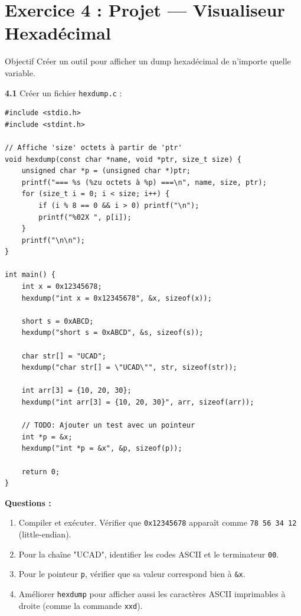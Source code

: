 \documentclass[10pt,a4paper]{article}
\begin{document}
\section{Exercice 4 : Projet — Visualiseur Hexadécimal}

\begin{exercicebox}{Objectif}
Créer un outil pour afficher un dump hexadécimal de n'importe quelle variable.
\end{exercicebox}

\textbf{4.1} Créer un fichier \texttt{hexdump.c} :

\begin{lstlisting}
#include <stdio.h>
#include <stdint.h>

// Affiche 'size' octets à partir de 'ptr'
void hexdump(const char *name, void *ptr, size_t size) {
    unsigned char *p = (unsigned char *)ptr;
    printf("=== %s (%zu octets à %p) ===\n", name, size, ptr);
    for (size_t i = 0; i < size; i++) {
        if (i % 8 == 0 && i > 0) printf("\n");
        printf("%02X ", p[i]);
    }
    printf("\n\n");
}

int main() {
    int x = 0x12345678;
    hexdump("int x = 0x12345678", &x, sizeof(x));
    
    short s = 0xABCD;
    hexdump("short s = 0xABCD", &s, sizeof(s));
    
    char str[] = "UCAD";
    hexdump("char str[] = \"UCAD\"", str, sizeof(str));
    
    int arr[3] = {10, 20, 30};
    hexdump("int arr[3] = {10, 20, 30}", arr, sizeof(arr));
    
    // TODO: Ajouter un test avec un pointeur
    int *p = &x;
    hexdump("int *p = &x", &p, sizeof(p));
    
    return 0;
}
\end{lstlisting}

\textbf{Questions :}
\begin{enumerate}[label=\alph*)]
    \item Compiler et exécuter. Vérifier que \texttt{0x12345678} apparaît comme \texttt{78 56 34 12} (little-endian).
    \item Pour la chaîne "UCAD", identifier les codes ASCII et le terminateur \texttt{00}.
    \item Pour le pointeur \texttt{p}, vérifier que sa valeur correspond bien à \texttt{\&x}.
    \item Améliorer \texttt{hexdump} pour afficher aussi les caractères ASCII imprimables à droite (comme la commande \texttt{xxd}).
\end{enumerate}
\end{document}

